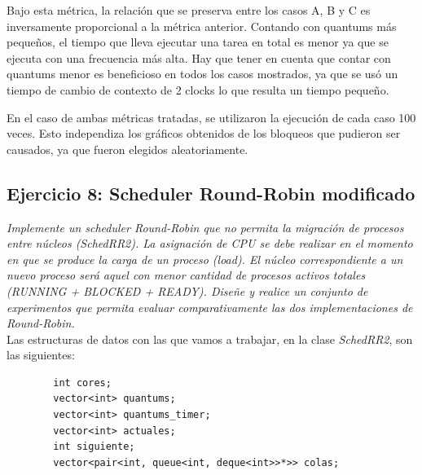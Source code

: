 \documentclass[a4paper]{article}
\begin{document}
Bajo esta m\'etrica, la relaci\'on que se preserva entre los casos A, B y C es inversamente proporcional a la m\'etrica anterior. Contando con quantums m\'as peque\~nos, el tiempo que lleva ejecutar una tarea en total es menor ya que se ejecuta con una frecuencia m\'as alta. Hay que tener en cuenta que contar con quantums menor es beneficioso en todos los casos mostrados, ya que se us\'o un tiempo de cambio de contexto de 2 clocks lo que resulta un tiempo peque\~no.\\

\bigskip
 
En el caso de ambas m\'etricas tratadas, se utilizaron la ejecuci\'on de cada caso 100 veces. Esto independiza los gr\'aficos obtenidos de los bloqueos que pudieron ser causados, ya que fueron elegidos aleatoriamente. 
 
 \newpage
 \subsection{Ejercicio 8: Scheduler Round-Robin modificado}

 
\textit{Implemente un scheduler Round-Robin que no permita la migraci\'on de procesos entre n\'ucleos (SchedRR2). La asignaci\'on de CPU se debe realizar en el momento en que se produce la carga de un proceso (load). El n\'ucleo correspondiente a un nuevo proceso ser\'a aquel con menor cantidad de procesos activos totales (RUNNING + BLOCKED + READY). Dise\~ne y realice un conjunto de experimentos que permita evaluar comparativamente las dos implementaciones de Round-Robin.}\\


Las estructuras de datos con las que vamos a trabajar, en la clase \emph{SchedRR2}, son las siguientes:


	\begin{codesnippet}
	\begin{verbatim}
		int cores;
		vector<int> quantums;
		vector<int> quantums_timer;
		vector<int> actuales;
		int siguiente;
		vector<pair<int, queue<int, deque<int>>*>> colas;
	\end{verbatim}
	\end{codesnippet}
	
\end{document}
